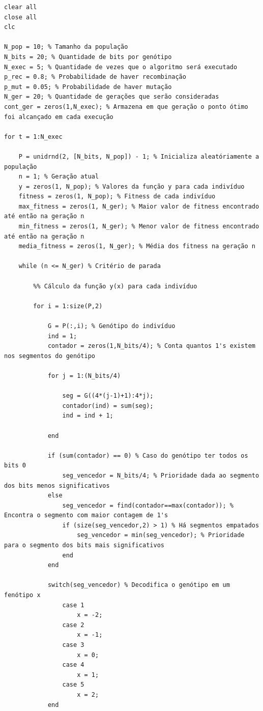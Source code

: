 \documentclass{report}
\begin{document}
	\begin{lstlisting}
clear all
close all
clc

N_pop = 10; % Tamanho da população
N_bits = 20; % Quantidade de bits por genótipo
N_exec = 5; % Quantidade de vezes que o algoritmo será executado
p_rec = 0.8; % Probabilidade de haver recombinação
p_mut = 0.05; % Probabilidade de haver mutação
N_ger = 20; % Quantidade de gerações que serão consideradas
cont_ger = zeros(1,N_exec); % Armazena em que geração o ponto ótimo foi alcançado em cada execução

for t = 1:N_exec

    P = unidrnd(2, [N_bits, N_pop]) - 1; % Inicializa aleatóriamente a população
    n = 1; % Geração atual
    y = zeros(1, N_pop); % Valores da função y para cada indivíduo
    fitness = zeros(1, N_pop); % Fitness de cada indivíduo
    max_fitness = zeros(1, N_ger); % Maior valor de fitness encontrado até então na geração n
    min_fitness = zeros(1, N_ger); % Menor valor de fitness encontrado até então na geração n
    media_fitness = zeros(1, N_ger); % Média dos fitness na geração n

    while (n <= N_ger) % Critério de parada

        %% Cálculo da função y(x) para cada indivíduo

        for i = 1:size(P,2)
            
            G = P(:,i); % Genótipo do indivíduo
            ind = 1;
            contador = zeros(1,N_bits/4); % Conta quantos 1's existem nos segmentos do genótipo

            for j = 1:(N_bits/4)

                seg = G((4*(j-1)+1):4*j);
                contador(ind) = sum(seg);
                ind = ind + 1;

            end

            if (sum(contador) == 0) % Caso do genótipo ter todos os bits 0
                seg_vencedor = N_bits/4; % Prioridade dada ao segmento dos bits menos significativos
            else
                seg_vencedor = find(contador==max(contador)); % Encontra o segmento com maior contagem de 1's
                if (size(seg_vencedor,2) > 1) % Há segmentos empatados
                    seg_vencedor = min(seg_vencedor); % Prioridade para o segmento dos bits mais significativos
                end
            end

            switch(seg_vencedor) % Decodifica o genótipo em um fenótipo x
                case 1
                    x = -2;
                case 2
                    x = -1;
                case 3
                    x = 0;
                case 4
                    x = 1;
                case 5
                    x = 2;
            end
            

\end{lstlisting}
\end{document}
